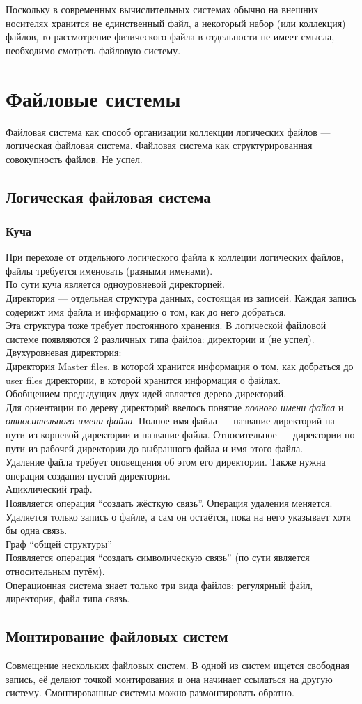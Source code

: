 \documentclass[12pt, a4paper]{article}
\begin{document}
    Поскольку в современных вычислительных системах обычно на внешних носителях хранится не единственный файл, а некоторый набор (или коллекция) файлов, то рассмотрение физического файла в отдельности не имеет смысла, необходимо смотреть файловую систему.
    \section{Файловые системы}
    Файловая система как способ организации коллекции логических файлов --- логическая файловая система.
    Файловая система как структурированная совокупность файлов. Не успел.
    \subsection[short]{Логическая файловая система}
    \subsubsection{Куча}
    При переходе от отдельного логического файла к коллеции логических файлов, файлы требуется именовать (разными именами).\\
    По сути куча является одноуровневой директорией.\\
    Директория --- отдельная структура данных, состоящая из записей. Каждая запись содерижт имя файла и информацию о том, как до него добраться.\\
    Эта структура тоже требует постоянного хранения. В логической файловой системе появляются 2 различных типа файлоа: директории и (не успел).
    Двухуровневая директория:\\
    Директория Master files, в которой хранится информация о том, как добраться до user files директории, в которой хранится информация о файлах.\\
    Обобщением предыдущих двух идей является дерево директорий.\\
    Для ориентации по дереву директорий ввелось понятие \textit{полного имени файла} и \textit{относительного имени файла}. Полное имя файла --- название директорий на пути из корневой директории и название файла. Относительное --- директории  по пути из рабочей директории до выбранного файла и имя этого файла.\\
    Удаление файла требует оповещения об этом его директории. Также нужна операция создания пустой директории.\\
    Ациклический граф.\\
    Появляется операция ``создать жёсткую связь''. Операция удаления меняется. Удаляется только запись о файле, а сам он остаётся, пока на него указывает хотя бы одна связь.\\
    Граф ``общей структуры''\\
    Появляется операция ``создать символическую связь'' (по сути является относительным путём).\\
    Операционная система знает только три вида файлов: регулярный файл, директория, файл типа связь.
    \subsection[short]{Монтирование файловых систем}
    Совмещение нескольких файловых систем. В одной из систем ищется свободная запись, её делают точкой монтирования и она начинает ссылаться на другую систему. Смонтированные системы можно размонтировать обратно.
\end{document}
